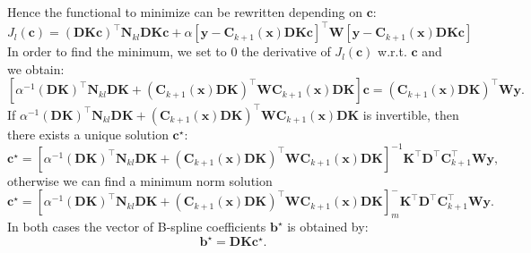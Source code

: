 Hence the functional to minimize can be rewritten depending on $\textbf{c}$:
\[J_l(\textbf{c}) = (\textbf{D}\textbf{K}\textbf{c})^\top \textbf{N}_{kl}\textbf{D}\textbf{K}\textbf{c} + \alpha [\textbf{y}-\textbf{C}_{k+1}(\textbf{x})\textbf{D}\textbf{K}\textbf{c}]^\top \textbf{W} [\textbf{y}-\textbf{C}_{k+1}(\textbf{x})\textbf{D}\textbf{K}\textbf{c}]\]
In order to find the minimum, we set to 0 the derivative of $J_l(\textbf{c})$ w.r.t. $\textbf{c}$ and we obtain:
\[ [\alpha^{-1}(\textbf{D}\textbf{K})^\top \textbf{N}_{kl} \textbf{D}\textbf{K}+ (\textbf{C}_{k+1}(\textbf{x})\textbf{D}\textbf{K})^\top\textbf{W}\textbf{C}_{k+1}(\textbf{x})\textbf{D}\textbf{K}]\textbf{c} = (\textbf{C}_{k+1}(\textbf{x})\textbf{D}\textbf{K})^\top \textbf{W}\textbf{y}.\]
If $\alpha^{-1}(\textbf{D}\textbf{K})^\top \textbf{N}_{kl} \textbf{D}\textbf{K}+ (\textbf{C}_{k+1}(\textbf{x})\textbf{D}\textbf{K})^\top\textbf{W}\textbf{C}_{k+1}(\textbf{x})\textbf{D}\textbf{K}$ is invertible, then there exists a unique solution $\textbf{c}^\star$:
\[\textbf{c}^\star = [\alpha^{-1}(\textbf{D}\textbf{K})^\top \textbf{N}_{kl} \textbf{D}\textbf{K}+ (\textbf{C}_{k+1}(\textbf{x})\textbf{D}\textbf{K})^\top\textbf{W}\textbf{C}_{k+1}(\textbf{x})\textbf{D}\textbf{K}]^{-1}\textbf{K}^\top\textbf{D}^\top\textbf{C}_{k+1}^\top \textbf{W}\textbf{y},\]
otherwise we can find a minimum norm solution
\[\textbf{c}^\star = [\alpha^{-1}(\textbf{D}\textbf{K})^\top \textbf{N}_{kl} \textbf{D}\textbf{K}+ (\textbf{C}_{k+1}(\textbf{x})\textbf{D}\textbf{K})^\top\textbf{W}\textbf{C}_{k+1}(\textbf{x})\textbf{D}\textbf{K}]_{m}^{-}\textbf{K}^\top\textbf{D}^\top\textbf{C}_{k+1}^\top \textbf{W}\textbf{y}.\]
In both cases the vector of B-spline coefficients $\textbf{b}^\star$ is obtained by:
\[\textbf{b}^\star = \textbf{D}\textbf{K}\textbf{c}^\star.\] 


